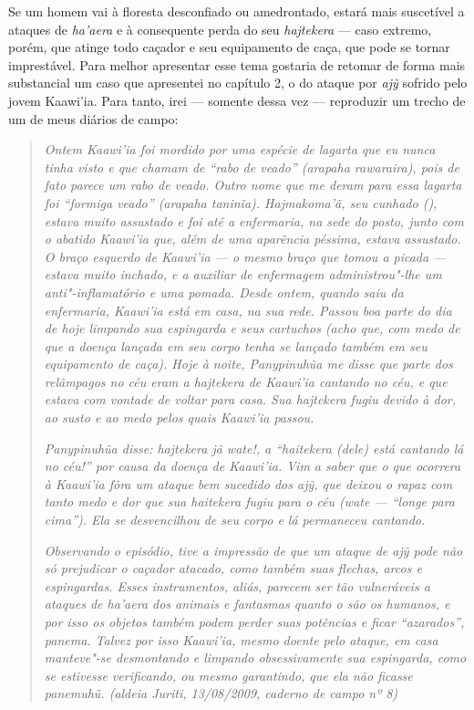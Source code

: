 Se um homem vai à floresta desconfiado ou amedrontado, estará mais
suscetível a ataques de \emph{ha'aera} e à consequente perda do seu
\emph{hajtekera} --- caso extremo, porém, que atinge todo caçador e seu
equipamento de caça, que pode se tornar imprestável. Para melhor
apresentar esse tema gostaria de retomar de forma mais substancial um
caso que apresentei no capítulo 2, o do ataque por \emph{ajỹ} sofrido
pelo jovem Kaawi'ia. Para tanto, irei --- somente dessa vez --- reproduzir
um trecho de um de meus diários de campo:

\begin{quote}
\emph{Ontem Kaawi'ia foi mordido por uma espécie de lagarta que eu nunca
tinha visto e que chamam de ``rabo de veado'' (arapaha rawaraira), pois de
fato parece um rabo de veado. Outro nome que me deram para essa lagarta
foi ``formiga veado'' (arapaha taninĩa). Hajmakoma'ã, seu cunhado (),
estava muito assustado e foi até a enfermaria, na sede do posto, junto
com o abatido Kaawi'ia que, além de uma aparência péssima, estava
assustado. O braço esquerdo de Kaawi'ia --- o mesmo braço que tomou a
picada --- estava muito inchado, e a auxiliar de enfermagem
administrou"-lhe um anti"-inflamatório e uma pomada. Desde ontem, quando
saiu da enfermaria, Kaawi'ia está em casa, na sua rede. Passou boa parte
do dia de hoje limpando sua espingarda e seus cartuchos (acho que, com
medo de que a doença lançada em seu corpo tenha se lançado também em seu
equipamento de caça). Hoje à noite, Panypinuhũa me disse que parte dos
relâmpagos no céu eram a hajtekera de Kaawi'ia cantando no céu, e que
estava com vontade de voltar para casa. Sua hajtekera fugiu devido à
dor, ao susto e ao medo pelos quais Kaawi'ia passou.}

\emph{Panypinuhũa disse: hajtekera jã wate!, a ``haitekera (dele) está
cantando lá no céu!'' por causa da doença de Kaawi'ia. Vim a saber que o
que ocorrera à Kaawi'ia fôra um ataque bem sucedido dos ajỹ, que deixou
o rapaz com tanto medo e dor que sua haitekera fugiu para o céu (wate ---
``longe para cima''). Ela se desvencilhou de seu corpo e lá permaneceu
cantando.}

\emph{Observando o episódio, tive a impressão de que um ataque de ajỹ
pode não só prejudicar o caçador atacado, como também suas flechas,
arcos e espingardas. Esses instrumentos, aliás, parecem ser tão
vulneráveis a ataques de ha'aera dos animais e fantasmas quanto o são os
humanos, e por isso os objetos também podem perder suas potências e
ficar ``azarados'', panema. Talvez por isso Kaawi'ia, mesmo doente pelo
ataque, em casa manteve"-se desmontando e limpando obsessivamente sua
espingarda, como se estivesse verificando, ou mesmo garantindo, que ela
não ficasse panemuhũ. (aldeia Juriti, 13/08/2009, caderno de campo nº
8)}
\end{quote}

